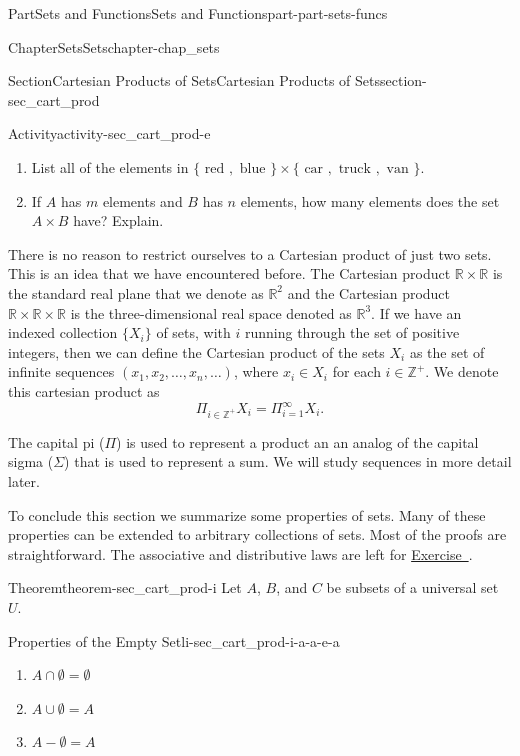 \documentclass[oneside,10pt,]{book}
\newcommand{\xreffont}{\relax}
\numberwithin{equation}{chapter}
\newcommand{\Z}{\mathbb{Z}}
\newcommand{\R}{\mathbb{R}}
\begin{document}
\begin{partptx}{Part}{Sets and Functions}{}{Sets and Functions}{}{}{part-part-sets-funcs}
\begin{chapterptx}{Chapter}{Sets}{}{Sets}{}{}{chapter-chap_sets}
\begin{sectionptx}{Section}{Cartesian Products of Sets}{}{Cartesian Products of Sets}{}{}{section-sec_cart_prod}
\begin{activity}{Activity}{}{activity-sec_cart_prod-e}
\begin{enumerate}[font=\bfseries,label=(\alph*),ref=\alph*]%
\item{}List all of the elements in \(\{\text{ red } , \text{ blue } \} \times \{\text{ car } , \text{ truck } , \text{ van } \}\).%
\item{}If \(A\) has \(m\) elements and \(B\) has \(n\) elements, how many elements does the set \(A \times B\) have? Explain.%
\end{enumerate}%
\end{activity}%
There is no reason to restrict ourselves to a Cartesian product of just two sets. This is an idea that we have encountered before. The Cartesian product \(\R \times \R\) is the standard real plane that we denote as \(\R^2\) and the Cartesian product \(\R \times \R \times \R\) is the three-dimensional real space denoted as \(\R^3\). If we have an indexed collection \(\{X_{i}\}\) of sets, with \(i\) running through the set of positive integers, then we can define the Cartesian product of the sets \(X_{i}\) as the set of infinite sequences \((x_1, x_2, \ldots,
x_n, \ldots)\), where \(x_i \in X_i\) for each \(i \in \Z^+\). We denote this cartesian product as%
\begin{equation*}
\Pi_{i \in \Z^+} X_i = \Pi_{i=1}^{\infty} X_i\text{.}
\end{equation*}
%
\par
The capital pi (\(\Pi\)) is used to represent a product an an analog of the capital sigma (\(\Sigma\)) that is used to represent a sum. We will study sequences in more detail later.%
\par
To conclude this section we summarize some properties of sets. Many of these properties can be extended to arbitrary collections of sets. Most of the proofs are straightforward. The associative and distributive laws are left for \hyperlink{exercise-ex_set_props}{Exercise~{\xreffont 3}}.%
\begin{theorem}{Theorem}{}{}{theorem-sec_cart_prod-i}%
Let \(A\), \(B\), and \(C\) be subsets of a universal set \(U\).%
\begin{descriptionlist}
\begin{dlinarrow}{Properties of the Empty Set}{li-sec_cart_prod-i-a-a-e-a}%
%
\begin{enumerate}[label=\roman*]
\item{}\(\displaystyle A \cap \emptyset = \emptyset\)%
\item{}\(\displaystyle A \cup \emptyset = A\)%
\item{}\(\displaystyle A-\emptyset = A\)%

\end{enumerate}
\end{dlinarrow}
\end{descriptionlist}
\end{theorem}
\end{sectionptx}
\end{chapterptx}
\end{partptx}
\end{document}
